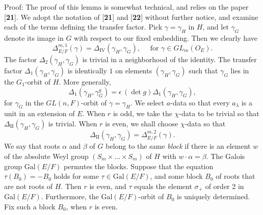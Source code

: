 \documentclass{amsart}
\begin{document}
\pproclaim Proof:
The proof of this lemma is somewhat technical, and relies on the paper [{\bf 21}].
We adopt the notation of [{\bf 21}] and [{\bf 22}] without further notice, 
and examine each of the terms defining the transfer factor.
%
Pick
  $ \gamma = \gamma_H $
in $H$, and let
  $ \gamma_G $
denote its image in $G$ with respect to our fixed embedding.
Then we clearly have
%
$$
  \Delta_{E/F}^{m,1} (\gamma) =
  \Delta_{\text{IV}}
  (\gamma_H, \gamma_G),\quad \text{ for }
  \gamma \in GL_m (O_E).
$$
%
The factor
  $ \Delta_2 (\gamma_H, \gamma_G) $
is trivial in a neighborhood of the identity. 
The transfer factor 
  $ \Delta_1 (\gamma_H, \gamma_G) $ is identically $1$
on elements
  $ (\gamma_H, \gamma_G ) $
such that
  $ \gamma_G $ 
lies in the 
  $G_1$-orbit of $H$.
More generally,
%
$$
  \Delta_1
  (\gamma_H, \gamma_G^g) =
  \epsilon \,(\det g) \Delta_1 (\gamma_H, \gamma_G),
$$
%
for $ \gamma_G $ in the $GL(n,F)$-orbit of $ \gamma= \gamma_H $.
We select $a$-data so that every 
  $ a_{\lambda} $
is a unit in an extension of $E$.
When $r$ is odd, we take the
  $ \chi $-data to be trivial so that
  $ \Delta_{\text{II}}
    (\gamma_H, \gamma_G) $
is trivial.
When $r$ is even,
we shall choose
  $ \chi $-data so that
%
$$
  \Delta_{\text{II}} (\gamma_H, \gamma_G) =
  \Delta_{E/F}^{m,2} (\gamma) .
$$
%
We say that roots $\alpha$ and $\beta$ of $G$ belong
to the same {\it block} if there is an element $w$ of
the absolute Weyl group $(S_m\times\ldots\times S_m)$
of $H$ with $w\cdot \alpha=\beta$. The Galois group
$\text{Gal}(E/F)$ permutes the blocks.  
Suppose that the equation $\tau(B_0) = -B_0$ holds for
some $\tau\in \text{Gal}(E/F)$, and some block $B_0$ of roots
that are not roots of $H$.  Then $r$ is even,
and $\tau$ equals the element $\sigma_+$ of order 2 in $\text{Gal}(E/F)$.
Furthermore, the $\text{Gal}(E/F)$-orbit of $B_0$ is uniquely determined.
Fix such a block $B_0$, when $r$ is even.
\end{document}
